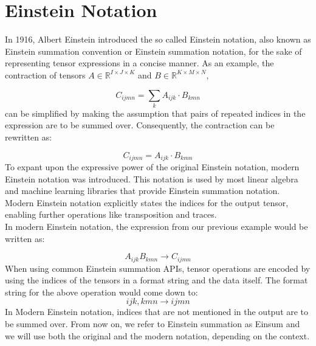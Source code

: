 \section{Einstein Notation}
In 1916, Albert Einstein introduced the so called Einstein notation, also known as
Einstein summation convention or Einstein summation notation, for the sake of
representing tensor expressions in a concise manner. As an example, the contraction of tensors
$A \in \mathbb{R}^{I \times J \times K}$ and $B \in \mathbb{R}^{K \times M \times N}$,

\[C_{ijmn} = \sum_{k}A_{ijk} \cdot B_{kmn}\]
%
can be simplified by making the assumption that pairs of repeated indices in the expression
are to be summed over. Consequently, the contraction can be rewritten as:

\[C_{ijmn} = A_{ijk} \cdot B_{kmn}\]
%
To expant upon the expressive power of the original Einstein notation, modern Einstein
notation was introduced. This notation is used by most linear algebra and machine
learning libraries that provide Einstein summation notation. Modern Einstein notation
explicitly states the indices for the output tensor, enabling further operations like
transposition and traces.\\
In modern Einstein notation, the expression from our previous example would
be written as:

\[A_{ijk}B_{kmn} \rightarrow C_{ijmn}\]
%
When using common Einstein summation APIs, tensor operations are encoded by using the
indices of the tensors in a format string and the data itself. The format string for the
above operation would come down to:
%
\[ijk,kmn \rightarrow ijmn\]
%
In Modern Einstein notation, indices that are not mentioned in the output are to be
summed over. From now on, we refer to Einstein summation as Einsum and we will use
both the original and the modern notation, depending on the context.